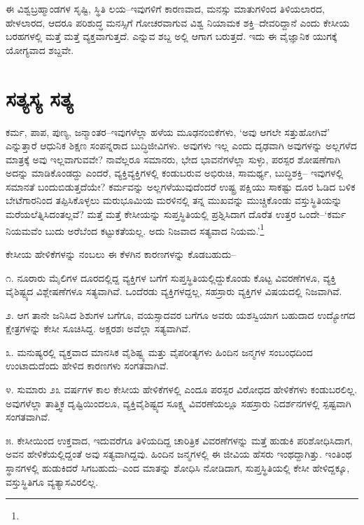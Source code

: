 ಈ ವಿಶ್ವಬ್ರಹ್ಮಾಂಡಗಳ ಸೃಷ್ಟಿ, ಸ್ಥಿತಿ ಲಯ–ಇವುಗಳಿಗೆ ಕಾರಣವಾದ, ಮನಸ್ಸು ಮಾತುಗಳಿಂದ ತಿಳಿಯಲಾರದ, ಹೇಳಲಾರದ, ಆದರೂ ಪರಿಶುದ್ಧ ಮನಸ್ಸಿಗೆ ಗೋಚರವಾಗುವ ವಿಶ್ವ ನಿಯಾಮಕ ಶಕ್ತಿ–ದೇವರಿದ್ದಾನೆ ಎಂದು ಕೇಸೀಯ ಬರಹಗಳಲ್ಲಿ ಮತ್ತೆ ಮತ್ತೆ ವ್ಯಕ್ತವಾಗುತ್ತದೆ.  ಎನ್ನುವ ಶಬ್ದ ಅಲ್ಲಿ ಆಗಾಗ ಬರುತ್ತದೆ. ಇದು ಈ ವೈಜ್ಞಾನಿಕ ಯುಗಕ್ಕೆ ಯೋಗ್ಯವಾದ ಶಬ್ದವೇ.


\section*{ಸತ್ಯಸ್ಯ ಸತ್ಯ}


ಕರ್ಮ, ಪಾಪ, ಪುಣ್ಯ, ಜನ್ಮಾಂತರ–ಇವುಗಳೆಲ್ಲಾ ಹಳೆಯ ಮೂಢನಂಬಿಕೆಗಳು, ‘ಅವು ಆಗಲೇ ಸತ್ತುಹೋಗಿವೆ’ ಎನ್ನುತ್ತಾರೆ ಆಧುನಿಕ ಶಿಕ್ಷಣ ಸಂಪನ್ನರಾದ ಬುದ್ಧಿಜೀವಿಗಳು. ಅವುಗಳು ಇಲ್ಲ ಎಂದು ದೃಢವಾಗಿ ಅವುಗಳನ್ನು ಅಲ್ಲಗಳೆದ ಮಾತ್ರಕ್ಕೆ ಅವು ಇಲ್ಲವಾಗುವವೇ? ನಾವೆಲ್ಲರೂ ಸಮಾನರು, ಭೇದ ಭಾವನೆಗಳೆಲ್ಲಾ ಸುಳ್ಳು, ಪರಸ್ಪರ ಶೋಷಣೆಗಾಗಿ ಅದನ್ನು ಮಾಡಿಕೊಂಡದ್ದು ಎಂದರೆ, ವ್ಯಕ್ತಿವ್ಯಕ್ತಿಗಳಲ್ಲಿ ಕಂಡುಬರುವ ಅಭಿರುಚಿ, ಸಾಮರ್ಥ್ಯ, ಬುದ್ಧಿಶಕ್ತಿ– ಇವುಗಳಲ್ಲಿ ಸಮಾನತೆ ಬಂದುಬಿಡುತ್ತದೆಯೇ? ಕರ್ಮವನ್ನು ಅಲ್ಲಗಳೆಯುವುದೆಂದರೆ ಉಷ್ಟ್ರ ಪಕ್ಷಿಯು ಸಾಕಷ್ಟು ದೂರ ಓಡಿದ ಬಳಿಕ ಬೇಟೆಗಾರನಿಂದ ತಪ್ಪಿಸಿಕೊಳ್ಳಲು ಮರುಭೂಮಿಯ ಮರಳಿನಲ್ಲಿ ತನ್ನ ಮುಖವನ್ನು ಮುಚ್ಚಿಕೊಂಡು ವಸ್ತುಸ್ಥಿತಿಯನ್ನು ಮರೆಯಲೆತ್ನಿಸಿದಂತಲ್ಲವೆ? ಮತ್ತೆ ಮತ್ತೆ ಕೇಸೀಯನ್ನು ಸುಪ್ತಸ್ಥಿತಿಯಲ್ಲಿ ಪ್ರಶ್ನಿಸಿದಾಗ ದೊರೆತ ಉತ್ತರ ಒಂದೇ–‘ಕರ್ಮ ನಿಯಮವೆಂ ಬುದು ಅರೆಬೆಂದ ಕಟ್ಟುಕತೆಯಲ್ಲ. ಅದು ನಿಜವಾದ ಸತ್ಯವಾದ ನಿಯಮ.’\footnote{}

ಕೇಸೀಯ ಹೇಳಿಕೆಗಳನ್ನು ನಂಬಲು ಈ ಕೆಳಗಿನ ಕಾರಣಗಳನ್ನು ಕೊಡಬಹುದು–

೧. ನೂರಾರು ಮೈಲಿಗಳ ದೂರದಲ್ಲಿದ್ದ ವ್ಯಕ್ತಿಗಳ ಬಗೆಗೆ ಸುಪ್ತಸ್ಥಿತಿಯಲ್ಲಿದ್ದುಕೊಂಡು ಕೊಟ್ಟ ವಿವರಣೆಗಳೂ, ವ್ಯಕ್ತಿ ವೈಶಿಷ್ಟ್ಯದ ವಿಶ್ಲೇಷಣೆಗಳೂ ಸತ್ಯವಾಗಿವೆ. ಒಂದೆರಡು ವ್ಯಕ್ತಿಗಳದ್ದಲ್ಲ, ಸಹಸ್ರಾರು ವ್ಯಕ್ತಿಗಳ ವಿಷಯದಲ್ಲಿ ನಿಜವಾಗಿವೆ.

೨. ಆಗ ತಾನೇ ಜನಿಸಿದ ಶಿಶುಗಳ ಬಗೆಗೂ, ವಯಸ್ಸಾದವರ ಬಗೆಗೂ ಅವರು ಯಶಸ್ವಿಯಾಗ ಬಹುದಾದ ಉದ್ಯೋಗದ ಕ್ಷೇತ್ರಗಳನ್ನು ಕೇಸೀ ಸೂಚಿಸಿದ್ದ. ಅಕ್ಷರಶಃ ಅವೆಲ್ಲಾ ಸತ್ಯವಾಗಿವೆ.

೩. ಮನುಷ್ಯರಲ್ಲಿ ವ್ಯಕ್ತವಾದ ಮಾನಸಿಕ ವೈಶಿಷ್ಟ್ಯ ಮತ್ತು ವೈಪರೀತ್ಯಗಳು ಹಿಂದಿನ ಜನ್ಮಗಳ ಸಂಬಂಧದಿಂದ ಉಂಟಾದುದೆಂದು ಹೇಳಿದ ಕಾರಣಗಳು ಸಂಗತವಾಗಿವೆ.

೪. ಸುಮಾರು ೨೩ ವರ್ಷಗಳ ಕಾಲ ಕೇಸೀಯ ಹೇಳಿಕೆಗಳಲ್ಲಿ ಎಂದೂ ಪರಸ್ಪರ ವಿರೋಧದ ಹೇಳಿಕೆಗಳು ಕಂಡುಬರಲಿಲ್ಲ. ಅವುಗಳೆಲ್ಲಾ ತಾತ್ತ್ವಿಕ ದೃಷ್ಟಿಯಿಂದಲೂ, ವ್ಯಕ್ತಿವೈಶಿಷ್ಟ್ಯದ ಸೂಕ್ಷ್ಮ ವಿವರಣೆಯಲ್ಲೂ ಸಹಸ್ರಾರು ನಿದರ್ಶನಗಳಲ್ಲಿ ಸ್ಪಷ್ಟವಾಗಿ ಸಂಗತವಾಗಿವೆ.

೫. ಕೇಸೀಯಿಂದ ಉಕ್ತವಾದ, ಇದುವರೆಗೂ ತಿಳಿಯದಿದ್ದ ಚಾರಿತ್ರಿಕ ವಿವರಣೆಗಳನ್ನು ಮತ್ತೆ ಹುಡುಕಿ ಪರಿಶೋಧಿಸಿದಾಗ, ಅವನ ಹೇಳಿಕೆಯಲ್ಲಿದ್ದಂತೆ ಅವು ಸತ್ಯವಾಗಿದ್ದವು. ಹಿಂದಿನ ಜನ್ಮಗಳಲ್ಲಿ ಈ ಜೀವಿಯ ಹೆಸರು ಇಂಥದ್ದಾಗಿತ್ತು. ಇಂತಿಂಥ ಸ್ಥಾನಗಳಲ್ಲಿ ಹುಡುಕಿದರೆ ಸಿಗಬಹುದು–ಎಂದ ಮಾತನ್ನು ಶೋಧಿಸಿ ನೋಡಿದಾಗ, ಸುಪ್ತಸ್ಥಿತಿಯಲ್ಲಿ ಕೇಸೀ ಹೇಳಿದ್ದಕ್ಕೂ, ವಸ್ತುಸ್ಥಿತಿಗೂ ವ್ಯತ್ಯಾಸವಿರಲಿಲ್ಲ.

